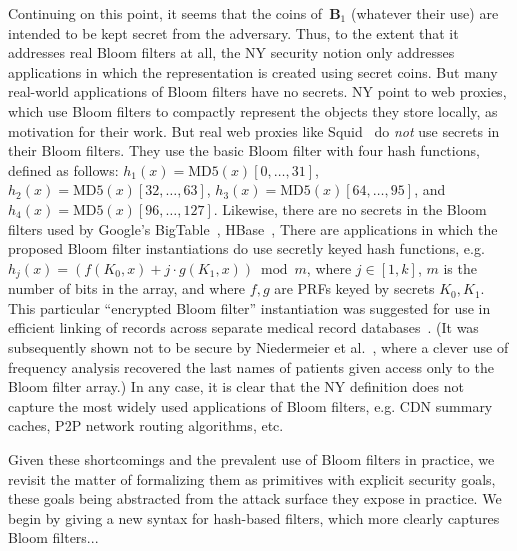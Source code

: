 Continuing on this point, it seems that the coins of~$\mathbf{B}_1$ (whatever their use) are intended to be kept secret from the adversary.  Thus, to the extent that it addresses real Bloom filters at all, the NY security notion only addresses applications in which the representation is created using secret coins.  But many real-world applications of Bloom filters have no secrets.  NY point to web proxies, which use Bloom filters to compactly represent the objects they store locally, as motivation for their work.  But real web proxies like Squid~\cite{xxx} do \emph{not} use secrets in their Bloom filters.  They use the basic Bloom filter with four hash functions, defined as follows: $h_1(x) = \mathrm{MD5}(x)[0,\ldots,31]$, $h_2(x)=\mathrm{MD5}(x)[32,\ldots,63]$, $h_3(x)=\mathrm{MD5}(x)[64,\ldots,95]$, and $h_4(x)=\mathrm{MD5}(x)[96,\ldots,127]$.  Likewise, there are no secrets in the Bloom filters used by Google's BigTable~\cite{xxx}, HBase~\cite{xxx},   There are applications in which the proposed Bloom filter instantiations do use secretly keyed hash functions, e.g. $h_j(x) = (f(K_0,x) + j\cdot g(K_1,x))\bmod m$, where $j\in[1,k]$, $m$ is the number of bits in the array, and where $f,g$ are PRFs keyed by secrets $K_0,K_1$.  This particular ``encrypted Bloom filter'' instantiation was suggested for use in efficient linking of records across separate medical record databases~\cite{xxx}.  (It was subsequently shown not to be secure by Niedermeier et al.~\cite{xxx}, where a clever use of frequency analysis recovered the last names of patients given access only to the Bloom filter array.)  In any case, it is clear that the NY definition does not capture the most widely used applications of Bloom filters, e.g. CDN summary caches, P2P network routing algorithms, etc.


Given these shortcomings and the prevalent use of Bloom filters in practice, we revisit the matter of formalizing them as primitives with explicit security goals, these goals being abstracted from the attack surface they expose in practice.   We begin by giving a new syntax for hash-based filters, which more clearly captures Bloom filters...

